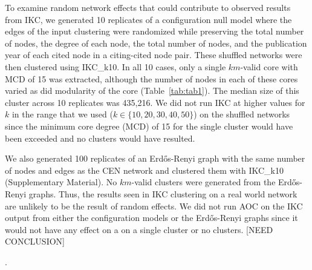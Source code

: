 \documentclass[12pt, oneside]{article}   	%
\begin{document}
To examine random network effects that could contribute to observed results from IKC, we generated 10 replicates of a configuration null model where the edges of the input clustering were randomized while preserving the total number of nodes, the degree of each node, the total number of nodes, and the publication year of each cited node in a citing-cited node pair. These shuffled networks were then clustered using IKC\_k10. In all 10 cases, only a single $km$-valid core with MCD of 15 was extracted, although the number of nodes in each of these cores varied as did modularity of the core (Table~\ref{tab:tab1}). The median size of this cluster across 10 replicates was 435,216. We did not run IKC at higher values for $k$ in the range that we used ($k \in {\{10,20,30,40, 50\}}$) on the shuffled networks since  the minimum core degree (MCD) of 15 for the single cluster would have been exceeded and no clusters would have resulted. 

We also generated 100 replicates of an Erd\H{o}s-Renyi graph with the same number of nodes and edges as the CEN network and clustered them with IKC\_k10 (Supplementary Material). No $km$-valid clusters were generated from the Erd\H{o}s-Renyi graphs. Thus, the results seen in IKC clustering on a real world network are unlikely to be the result of random effects. We did not run AOC on the IKC output from either the configuration models or the Erd\H{o}s-Renyi graphs since it would not have any effect on a on a single cluster or no clusters. [NEED CONCLUSION]

. 

\end{document}
